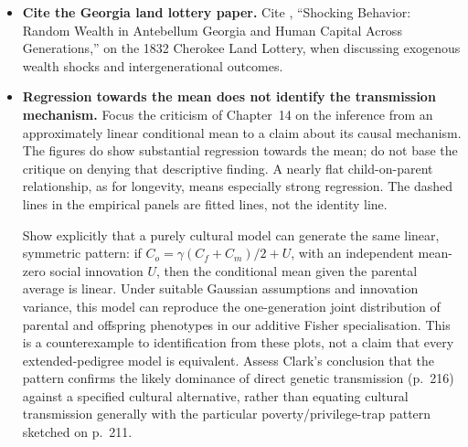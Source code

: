 \begin{itemize}
\par\medskip
\textit{Preferred option: homogeneity of consumer demand.}
In the standard consumer model, doubling all prices and nominal income
leaves the budget set unchanged. With unchanged preferences and a unique
optimum, it therefore leaves demand unchanged. Homogeneity of demand is
a consequence of the model, not an additional assumption to be accepted
or discarded independently. A fitted demand equation that responds to
this common rescaling may be useful descriptively, but it cannot
represent the maintained choice model. Likewise, the phenotypic-assortment
model does not permit independent choices of $m$, $r$ and $h^2$: its
assumptions require $m=h^2r$.

\item \textbf{Cite the Georgia land lottery paper.}
Cite \citet{BleakleyFerrie2016}, ``Shocking Behavior: Random Wealth in
Antebellum Georgia and Human Capital Across Generations,'' on the 1832
Cherokee Land Lottery, when discussing exogenous wealth shocks and
intergenerational outcomes.

\item \textbf{Regression towards the mean does not identify the transmission mechanism.}
Focus the criticism of Chapter~14 on the inference from an approximately
linear conditional mean to a claim about its causal mechanism.
The figures do show substantial regression towards the mean; do not
base the critique on denying that descriptive finding. A nearly flat
child-on-parent relationship, as for longevity, means especially strong
regression. The dashed lines in the empirical panels are fitted lines,
not the identity line.

Show explicitly that a purely cultural model can generate the same
linear, symmetric pattern: if
$C_o=\gamma(C_f+C_m)/2+U$, with an independent mean-zero social
innovation $U$, then the conditional mean given the parental average
is linear. Under suitable Gaussian assumptions and innovation variance,
this model can reproduce the one-generation joint distribution of
parental and offspring phenotypes in our additive Fisher specialisation.
This is a counterexample to identification from these plots, not a claim
that every extended-pedigree model is equivalent. Assess Clark's
conclusion that the pattern confirms the likely dominance of direct
genetic transmission (p.~216) against a specified cultural alternative,
rather than equating cultural transmission generally with the particular
poverty/privilege-trap pattern sketched on p.~211.


\end{itemize}
